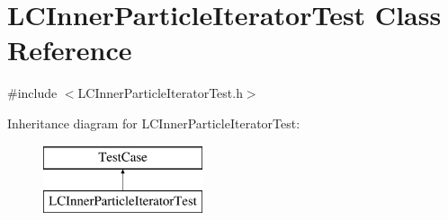 \hypertarget{classLCInnerParticleIteratorTest}{\section{L\-C\-Inner\-Particle\-Iterator\-Test Class Reference}
\label{classLCInnerParticleIteratorTest}
}


{\ttfamily \#include $<$L\-C\-Inner\-Particle\-Iterator\-Test.\-h$>$}

Inheritance diagram for L\-C\-Inner\-Particle\-Iterator\-Test\-:\begin{figure}[H]
\begin{center}
\leavevmode
\includegraphics[height=2.000000cm]{classLCInnerParticleIteratorTest}
\end{center}
\end{figure}
